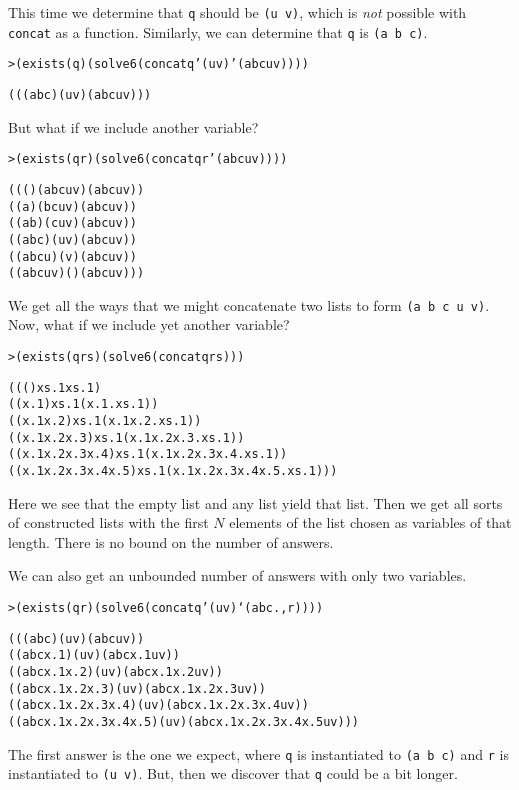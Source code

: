 \noindent
This time we determine that \texttt{q} should be \texttt{(u v)}, which
is \emph{not} possible with \texttt{concat} as a function.
Similarly, we can determine that \texttt{q} is \texttt{(a b c)}.

\begin{alltt}
> (exists (q) (solve 6 (concat q '(u v) '(a b c u v))))

(((a b c) (u v) (a b c u v)))
\end{alltt}

\noindent
But what if we include another variable?
\begin{alltt}
> (exists (q r) (solve 6 (concat q r '(a b c u v))))

((() (a b c u v) (a b c u v))
 ((a) (b c u v) (a b c u v))
 ((a b) (c u v) (a b c u v))
 ((a b c) (u v) (a b c u v))
 ((a b c u) (v) (a b c u v))
 ((a b c u v) () (a b c u v)))
\end{alltt}

\noindent
We get all the ways that we might concatenate
two lists to form \texttt{(a b c u v)}.
Now, what if we include yet another variable?

\begin{alltt}
> (exists (q r s) (solve 6 (concat q r s)))

((() xs.1 xs.1)
((x.1) xs.1 (x.1 . xs.1))
((x.1 x.2) xs.1 (x.1 x.2 . xs.1))
((x.1 x.2 x.3) xs.1 (x.1 x.2 x.3 . xs.1))
((x.1 x.2 x.3 x.4) xs.1 (x.1 x.2 x.3 x.4 . xs.1))
((x.1 x.2 x.3 x.4 x.5) xs.1 (x.1 x.2 x.3 x.4 x.5 . xs.1)))
\end{alltt}

\noindent
Here we see that the empty list and any list yield that list.  Then we
get all sorts of constructed lists with the first $N$ elements of the
list chosen as variables of that length.  There is no bound on the
number of answers.  

We can also get an unbounded number of answers with only two variables.

\begin{alltt}
> (exists (q r) (solve 6 (concat q '(u v) `(a b c . ,r))))

(((a b c) (u v) (a b c u v))
((a b c x.1) (u v) (a b c x.1 u v))
((a b c x.1 x.2) (u v) (a b c x.1 x.2 u v))
((a b c x.1 x.2 x.3) (u v) (a b c x.1 x.2 x.3 u v))
((a b c x.1 x.2 x.3 x.4) (u v) (a b c x.1 x.2 x.3 x.4 u v))
((a b c x.1 x.2 x.3 x.4 x.5) (u v) (a b c x.1 x.2 x.3 x.4 x.5 u v)))
\end{alltt}

\noindent
The first answer is the one we expect, where \texttt{q} is
instantiated to \texttt{(a b c)} and \texttt{r} is instantiated to
\texttt{(u v)}.  But, then we discover that \texttt{q} could be a bit
longer.  

